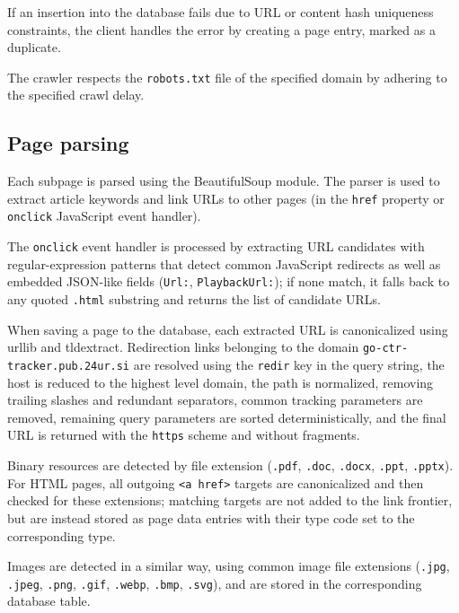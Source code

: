 \documentclass[conference]{IEEEtran}
\begin{document}
If an insertion into the database fails due to URL or content hash uniqueness constraints, the client handles the error by creating a page entry, marked as a duplicate.

The crawler respects the \texttt{robots.txt} file of the specified domain by adhering to the specified crawl delay.





\subsection{Page parsing}
Each subpage is parsed using the BeautifulSoup\cite{beautifulsoup} module. The parser is used to extract article keywords and link URLs to other pages (in the \texttt{href} property or \texttt{onclick} JavaScript event handler).

The \texttt{onclick} event handler is processed by extracting URL candidates with regular-expression patterns that detect common JavaScript redirects as well as embedded JSON-like fields (\texttt{Url:}, \texttt{PlaybackUrl:}); if none match, it falls back to any quoted \texttt{.html} substring and returns the list of candidate URLs.

When saving a page to the database, each extracted URL is canonicalized using urllib\cite{urllib} and tldextract\cite{tldextract}. Redirection links belonging to the domain \texttt{go-ctr-tracker.pub.24ur.si} are resolved using the \texttt{redir} key in the query string, the host is reduced to the highest level domain, the path is normalized, removing trailing slashes and redundant separators, common tracking parameters are removed, remaining query parameters are sorted deterministically, and the final URL is returned with the \texttt{https} scheme and without fragments.

Binary resources are detected by file extension (\texttt{.pdf}, \texttt{.doc}, \texttt{.docx}, \texttt{.ppt}, \texttt{.pptx}). 
For HTML pages, all outgoing \texttt{<a href>} targets are canonicalized and then checked for these extensions; matching targets 
are not added to the link frontier, but are instead stored as page data entries with their type code set to the corresponding type.

Images are detected in a similar way, using common image file extensions (\texttt{.jpg}, \texttt{.jpeg}, \texttt{.png}, \texttt{.gif}, \texttt{.webp}, \texttt{.bmp}, \texttt{.svg}), and are stored in the corresponding database table.
\end{document}
